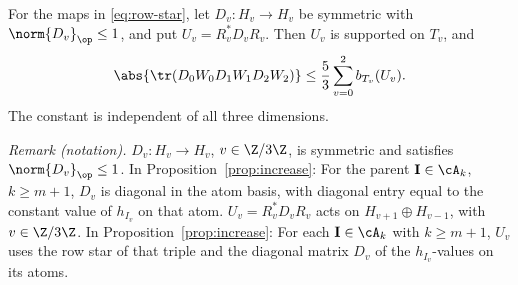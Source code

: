 \begin{proposition}\label{prop:trace}
For the maps in \eqref{eq:row-star}, let \(D_v:H_v\to H_v\) be
symmetric with \(\norm{D_v}_{\op}\le1\), and put
\(U_v=R_v^*D_vR_v\). Then \(U_v\) is supported on \(T_v\), and
\begin{equation}\label{eq:trace}
 \abs{\tr(D_0W_0D_1W_1D_2W_2)}
       \le\frac53\sum_{v=0}^2 b_{T_v}(U_v).
\end{equation}
The constant is independent of all three dimensions.
\end{proposition}

\noindent\textit{Remark (notation).} $D_v:H_v\to H_v$, $v\in\Z/3\Z$, is symmetric and satisfies $\norm{D_v}_{\op}\le1$. In Proposition~\ref{prop:increase}: For the parent $\mathbf I\in\cA_k$, $k\ge m+1$, $D_v$ is diagonal in the atom basis, with diagonal entry equal to the constant value of $h_{I_v}$ on that atom. $U_v=R_v^*D_vR_v$ acts on $H_{v+1}\oplus H_{v-1}$, with $v\in\Z/3\Z$. In Proposition~\ref{prop:increase}: For each $\mathbf I\in\cA_k$ with $k\ge m+1$, $U_v$ uses the row star of that triple and the diagonal matrix $D_v$ of the $h_{I_v}$-values on its atoms.


